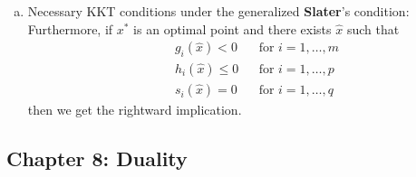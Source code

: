 \documentclass{article}
\begin{document}
\begin{enumerate}
\begin{enumerate}[a.]
        \item Necessary KKT conditions under the generalized \textbf{Slater}’s condition: Furthermore, if \(x^*\) is an optimal point and there exists \(\hat{x}\) such that
        \[
        \begin{aligned}
        \quad & g_i(\hat{x}) < 0 && \text{for } i = 1, \dots, m \\
        & h_i(\hat{x}) \leq 0 && \text{for } i = 1, \dots, p \\
        & s_i(\hat{x}) = 0 && \text{for } i = 1, \dots, q
        \end{aligned}
        \]
        then we get the rightward implication.
    \end{enumerate}
\end{enumerate}

\subsection*{Chapter 8: Duality}
\end{document}
